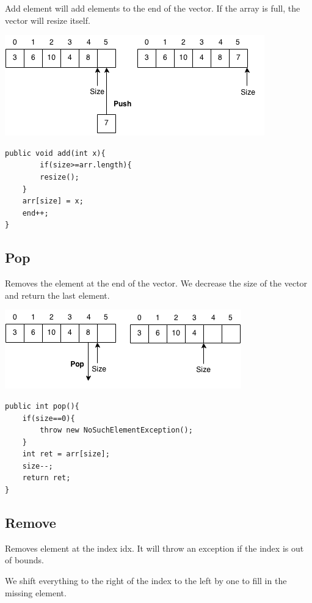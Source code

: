 \documentclass[11pt,oneside]{book}
\makeatletter
\def\maxwidth#1{\ifdim\Gin@nat@width>#1 #1\else\Gin@nat@width\fi}
\makeatother
\begin{document}
Add element will add elements to the end of the vector. If the array is full, the vector will resize itself.

\includegraphics[width=\maxwidth{\textwidth}]{vector2.png}

\begin{lstlisting}
public void add(int x){
        if(size>=arr.length){
        resize();
    }
    arr[size] = x;
    end++;
}
\end{lstlisting}

\subsection{Pop}

Removes the element at the end of the vector. We decrease the size of the vector and return the last element.

\includegraphics[width=\maxwidth{\textwidth}]{vector4.png}

\begin{lstlisting}
public int pop(){
    if(size==0){
        throw new NoSuchElementException();
    }
    int ret = arr[size];
    size--;
    return ret;
}
\end{lstlisting}

\subsection{Remove}

Removes element at the index idx. It will throw an exception if the index is out of bounds.

We shift everything to the right of the index to the left by one to fill in the missing element.
\end{document}
